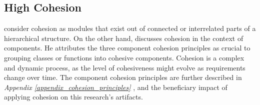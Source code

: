 \subsection{High Cohesion} \label{subsubsec_on_cohesion}

\textcite[22]{mannaert_normalized_2016} consider cohesion as modules that exist out of
connected or interrelated parts of a hierarchical structure. On the other hand,
\textcite[118]{robert_c_martin_clean_2018} discusses cohesion in the context of
components. He attributes the three component cohesion principles as crucial to grouping
classes or functions into cohesive components. Cohesion is a complex and dynamic process,
as the level of cohesiveness might evolve as requirements change over time. The component
cohesion principles are further described in \textit{Appendix
\ref{appendix_cohesion_principles} }, and the
beneficiary impact of applying cohesion on this research’s artifacts.